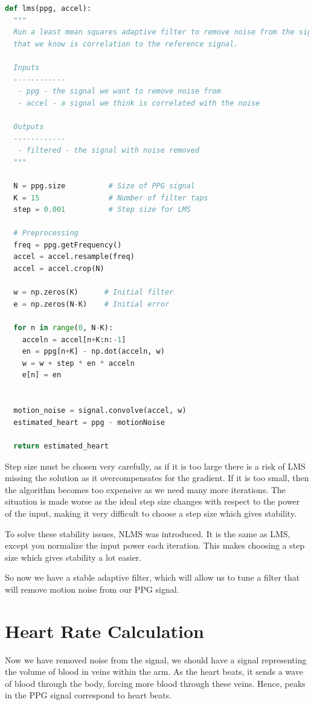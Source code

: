 \documentclass[12pt,a4paper,twoside,openright]{report}
\begin{document}
\begin{lstlisting}[language=Python]
def lms(ppg, accel):
  """ 
  Run a least mean squares adaptive filter to remove noise from the signal
  that we know is correlation to the reference signal.

  Inputs
  ------------
   - ppg - the signal we want to remove noise from
   - accel - a signal we think is correlated with the noise

  Outputs
  ------------
   - filtered - the signal with noise removed
  """

  N = ppg.size          # Size of PPG signal
  K = 15                # Number of filter taps
  step = 0.001          # Step size for LMS

  # Preprocessing
  freq = ppg.getFrequency()
  accel = accel.resample(freq)
  accel = accel.crop(N)

  w = np.zeros(K)      # Initial filter
  e = np.zeros(N-K)    # Initial error

  for n in range(0, N-K):
    acceln = accel[n+K:n:-1]
    en = ppg[n+K] - np.dot(acceln, w)    
    w = w + step * en * acceln
    e[n] = en


  motion_noise = signal.convolve(accel, w)
  estimated_heart = ppg - motionNoise

  return estimated_heart
\end{lstlisting}

Step size must be chosen very carefully, as if it is too large there is a risk
of LMS missing the solution as it overcompensates for the gradient. If it is
too small, then the algorithm becomes too expensive as we need many more
iterations. The situation is made worse as the ideal step size changes with
respect to the power of the input, making it very difficult to choose a step
size which gives stability.

To solve these stability issues, NLMS was introduced. It is the same as LMS, except you normalize the input power each
iteration. This makes choosing a step size which gives stability a lot easier.

So now we have a stable adaptive filter, which will allow us to tune a filter
that will remove motion noise from our PPG signal.

\section{Heart Rate Calculation}

Now we have removed noise from the signal, we should have a signal 
representing the volume of blood in veins within the arm. As the heart beats,
it sends a wave of blood through the body, forcing more blood through these
veins. Hence, peaks in the PPG signal correspond to heart beats. 
\end{document}
